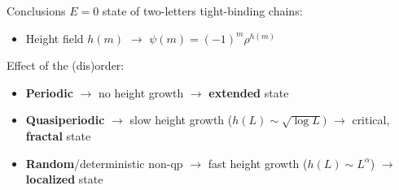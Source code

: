 \begin{frame}{Conclusions}
$E=0$ state of \textcolor{BostonBlue}{two}-\textcolor{comp}{letters} tight-binding chains:
\begin{itemize}
	\item Height field $h(m)$ $\to$ $\psi(m) = (-1)^m \rho^{h(m)}$
\end{itemize}
Effect of the (dis)order:
\begin{itemize}
	\item \textbf{Periodic} $\to$ no height growth $\to$ \textbf{extended} state
	\item \textbf{Quasiperiodic} $\to$ slow height growth ($h(L) \sim \sqrt{\log L})$ $\to$ critical, \textbf{fractal} state
	\item \textbf{Random}/deterministic non-qp $\to$ fast height growth ($h(L) \sim L^\alpha$) $\to$ \textbf{localized} state
\end{itemize}
\end{frame}
